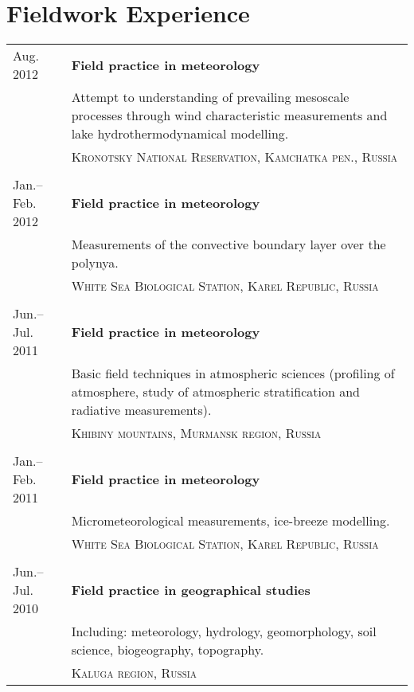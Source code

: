 \documentclass[a4paper,11pt]{article}
\newlength{\mycol}
\begin{document}
\section{Fieldwork Experience}
\begin{tabu} to 
 {\small Aug.} 2012 & \textbf{Field practice in meteorology} \\
& Attempt to understanding of prevailing mesoscale processes through wind characteristic measurements and lake hydrothermodynamical modelling. \\
& \textsc{Kronotsky National Reservation, Kamchatka pen., Russia}\\
 \\

 {\small Jan.--Feb.} 2012 & \textbf{Field practice in meteorology} \\
& Measurements of the convective boundary layer over the polynya. \\
& \textsc{White Sea Biological Station, Karel Republic, Russia}\\
 \\

 {\small Jun.--Jul.} 2011 & \textbf{Field practice in meteorology} \\
& Basic field techniques in atmospheric sciences (profiling of atmosphere, study of atmospheric stratification and radiative measurements).  \\
& \textsc{Khibiny mountains, Murmansk region, Russia}\\
 \\

 {\small Jan.--Feb.} 2011 & \textbf{Field practice in meteorology} \\
& Micrometeorological measurements, ice-breeze modelling. \\
& \textsc{White Sea Biological Station, Karel Republic, Russia}\\
 \\

 {\small Jun.--Jul.} 2010 & \textbf{Field practice in geographical studies} \\
& Including: meteorology, hydrology, geomorphology, soil science, biogeography, topography. \\
& \textsc{Kaluga region, Russia}
\end{tabu}
\end{document}
